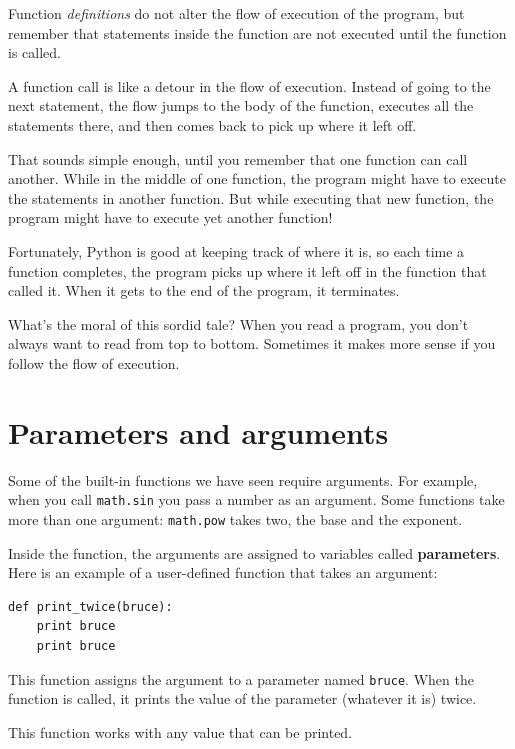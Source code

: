 \documentclass[10pt]{book}
\begin{document}
Function {\em definitions} do not alter the flow of execution of the
program, but remember that statements inside the function are not
executed until the function is called.

A function call is like a detour in the flow of execution. Instead of
going to the next statement, the flow jumps to the body of
the function, executes all the statements there, and then comes back
to pick up where it left off.

That sounds simple enough, until you remember that one function can
call another.  While in the middle of one function, the program might
have to execute the statements in another function. But while
executing that new function, the program might have to execute yet
another function!

Fortunately, Python is good at keeping track of where it is, so each
time a function completes, the program picks up where it left off in
the function that called it.  When it gets to the end of the program,
it terminates.

What's the moral of this sordid tale?  When you read a program, you
don't always want to read from top to bottom.  Sometimes it makes
more sense if you follow the flow of execution.


\section{Parameters and arguments}
\label{parameters}

Some of the built-in functions we have seen require arguments.  For
example, when you call {\tt math.sin} you pass a number
as an argument.  Some functions take more than one argument:
{\tt math.pow} takes two, the base and the exponent.

Inside the function, the arguments are assigned to
variables called {\bf parameters}.  Here is an example of a
user-defined function that takes an argument:


\beforeverb
\begin{verbatim}
def print_twice(bruce):
    print bruce
    print bruce
\end{verbatim}
\afterverb
%
This function assigns the argument to a parameter
named {\tt bruce}.  When the function is called, it prints the value of
the parameter (whatever it is) twice.

This function works with any value that can be printed.
\end{document}
